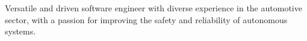 

\begin{cvparagraph}

Versatile and driven software engineer with diverse experience in the automotive sector, with a passion for improving the safety and reliability of autonomous systems.
\end{cvparagraph}
